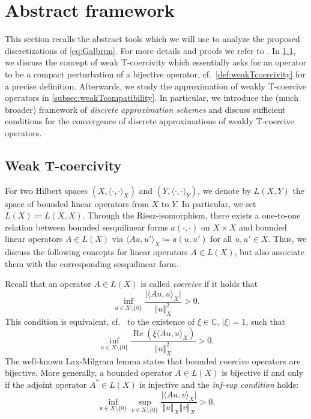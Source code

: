 \documentclass{m2an}
\newcommand{\spl}{\langle}
\newcommand{\spr}{\rangle}
\renewcommand\Re{\operatorname{Re}}
\theoremstyle{plain}
\theoremstyle{definition}
\begin{document}
\section{Abstract framework}\label{sec:framework}
This section recalls the abstract tools which we will use to analyze the proposed discretizations of \eqref{eq:Galbrun}. For more details and proofs we refer to \cite{HLS22H1,H23Hdiv,Thesis_vB23}. In \cref{subsec:weakTcoercivity}, we discuss the concept of weak T-coercivity which essentially asks for an operator to be a compact perturbation of a bijective operator, cf.~\cref{def:weakTcoercivity} for a precise definition. Afterwards, we study the approximation of weakly T-coercive operators in \cref{subsec:weakTcompatibility}. In particular, we introduce the (much broader) framework of \emph{discrete approximation schemes} and discuss sufficient conditions for the convergence of discrete approximations of weakly T-coercive operators.  

\subsection{Weak T-coercivity}\label{subsec:weakTcoercivity}
For two Hilbert spaces $(X,\spl \cdot, \cdot \spr_X)$ and $(Y,\spl \cdot, \cdot \spr_Y)$, we denote by $L(X,Y)$ the space of bounded linear operators from $X$ to $Y$. In particular, we set $L(X) \coloneqq L(X,X)$. Through the Riesz-isomorphism, there exists a one-to-one relation between bounded sesquilinear forms $a(\cdot,\cdot)$ on $X \times X$ and bounded linear operators $A \in L(X)$ via $\spl Au, u' \spr_X \coloneqq a(u,u')$ for all $u, u' \in X$. Thus, we discuss the following concepts for linear operators $A \in L(X)$, but also associate them with the corresponding sesquilinear form. 

Recall that an operator $A \in L(X)$ is called \emph{coercive} if it holds that
$$\inf_{u \in X \setminus \{ 0 \}} \frac{\vert \spl Au, u \spr_X \vert}{\Vert u \Vert^2_X} > 0.$$
This condition is equivalent, cf.~\cite[Lem.~C.58]{EG_FE2} to the existence of $\xi \in \mathbb{C}$, $\vert \xi \vert = 1$, such that 
\begin{equation} \label{eq:coercivity:C}
\inf_{u \in X \setminus \{ 0 \}} \frac{\Re( \xi \spl Au, u \spr_X)}{\Vert u \Vert^2_X} > 0 .
\end{equation}
The well-known Lax-Milgram lemma states that bounded coercive operators are bijective. More generally, a bounded operator $A \in L(X)$ is bijective if and only if the adjoint operator $A^{\ast} \in L(X)$ is injective and the \emph{inf-sup condition} holds:
\begin{equation*}
   \inf_{u \in X  \setminus \{ 0 \}} \sup_{v \in X  \setminus \{ 0 \}} \frac{\vert \spl Au, v \spr_X \vert}{\Vert u \Vert_X \Vert v \Vert_X} > 0.
\end{equation*}
\end{document}
